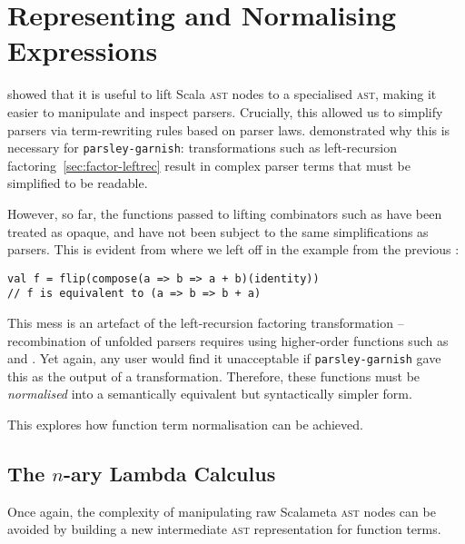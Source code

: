 \documentclass[../../../main.tex]{subfiles}
\begin{document}
\section{Representing and Normalising Expressions}\label{sec:function-representation}

 showed that it is useful to lift Scala \textsc{ast} nodes to a specialised  \textsc{ast}, making it easier to manipulate and inspect parsers.
Crucially, this allowed us to simplify parsers via term-rewriting rules based on parser laws.
 demonstrated why this is necessary for \texttt{parsley-garnish}: transformations such as left-recursion factoring~\cref{sec:factor-leftrec} result in complex parser terms that must be simplified to be readable.

However, so far, the functions passed to lifting combinators such as  have been treated as opaque, and have not been subject to the same simplifications as parsers.
This is evident from where we left off in the example from the previous :
\begin{verbatim}
val f = flip(compose(a => b => a + b)(identity))
// f is equivalent to (a => b => b + a)
\end{verbatim}
%
This mess is an artefact of the left-recursion factoring transformation -- recombination of unfolded parsers requires using higher-order functions such as  and .
Yet again, any user would find it unacceptable if \texttt{parsley-garnish} gave this as the output of a transformation.
Therefore, these functions must be \emph{normalised} into a semantically equivalent but syntactically simpler form.

This  explores how function term normalisation can be achieved. %

\subsection{The $n$-ary Lambda Calculus}
Once again, the complexity of manipulating raw Scalameta \textsc{ast} nodes can be avoided by building a new intermediate \textsc{ast} representation for function terms.
\end{document}
